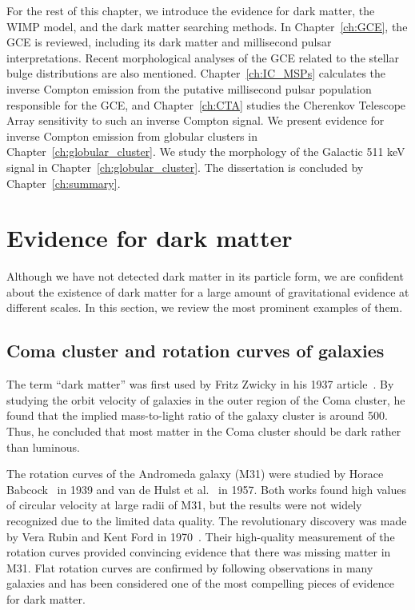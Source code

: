\documentclass[doublespace,nopageskip]{VTthesis} %
\begin{document}
For the rest of this chapter, we introduce the evidence for dark matter, the WIMP model, and the dark matter searching methods. In Chapter~\ref{ch:GCE}, the GCE is reviewed, including its dark matter and millisecond pulsar interpretations. Recent morphological analyses of the GCE related to the stellar bulge distributions are also mentioned. Chapter~\ref{ch:IC_MSPs} calculates the inverse Compton emission from the putative millisecond pulsar population responsible for the GCE, and Chapter~\ref{ch:CTA} studies the Cherenkov Telescope Array sensitivity to such an inverse Compton signal. We present evidence for inverse Compton emission from globular clusters in Chapter~\ref{ch:globular_cluster}. We study the morphology of the Galactic 511 keV signal in Chapter~\ref{ch:globular_cluster}. The dissertation is concluded by Chapter~\ref{ch:summary}.

\section{Evidence for dark matter} \label{se:one_section}

Although we have not detected dark matter in its particle form, we are confident about the existence of dark matter for a large amount of gravitational evidence at different scales. In this section, we review the most prominent examples of them.

\subsection{Coma cluster and rotation curves of galaxies} \label{sse:rotation_curve}

The term ``dark matter'' was first used by Fritz Zwicky in his 1937 article~\cite{1933AcHPh...6..110Z}. By studying the orbit velocity of galaxies in the outer region of the Coma cluster, he found that the implied mass-to-light ratio of the galaxy cluster is around 500. Thus, he concluded that most matter in the Coma cluster should be dark rather than luminous.

The rotation curves of the Andromeda galaxy (M31) were studied by Horace Babcock~\cite{1939LicOB..19....1B} in 1939 and van de Hulst et al.~\cite{1957BAN....14....1V} in 1957. Both works found high values of circular velocity at large radii of M31, but the results were not widely recognized due to the limited data quality. The revolutionary discovery was made by Vera Rubin and Kent Ford in 1970~\cite{1970ApJ...159..379R}. Their high-quality measurement of the rotation curves provided convincing evidence that there was missing matter in M31. Flat rotation curves are confirmed by following observations in many galaxies and has been considered one of the most compelling pieces of evidence for dark matter.
\end{document}
